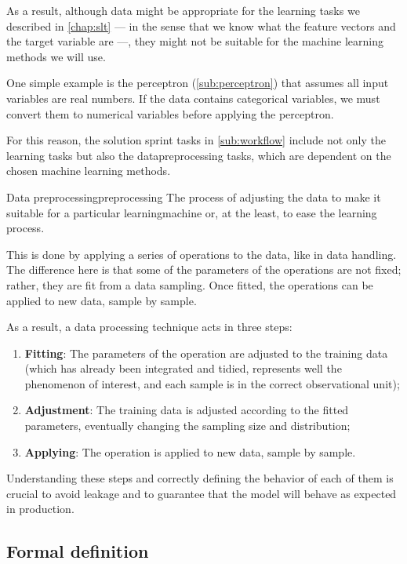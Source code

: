 As a result, although data might be appropriate for the learning tasks we described in
\cref{chap:slt} --- in the sense that we know what the feature vectors and the target
variable are ---, they might not be suitable for the machine learning methods we will use.

One simple example is the perceptron (\cref{sub:perceptron}) that assumes all
input variables are real numbers.  If the data contains categorical variables, we must
convert them to numerical variables before applying the perceptron.

For this reason, the solution sprint tasks in \cref{sub:workflow} include not only the
learning tasks but also the \gls{datapreprocessing} tasks, which are dependent on the
chosen machine learning methods.

\begin{defbox}{Data preprocessing}{preprocessing}
  The process of adjusting the data to make it suitable for a particular \gls{learningmachine}
  or, at the least, to ease the learning process.
\end{defbox}

This is done by applying a series of operations to the data, like in data handling.  The
difference here is that some of the parameters of the operations are not fixed; rather, they
are fit from a data sampling.  Once fitted, the operations can be applied to
new data, sample by sample.

As a result, a data processing technique acts in three steps:
\begin{enumerate}
  \itemsep0em
  \item \textbf{Fitting}: The parameters of the operation are adjusted to the training
    data (which has already been integrated and tidied, represents well the phenomenon of
    interest, and each sample is in the correct observational unit);
  \item \textbf{Adjustment}: The training data is adjusted according to the fitted
    parameters, eventually changing the sampling size and distribution;
  \item \textbf{Applying}: The operation is applied to new data, sample by sample.
\end{enumerate}

Understanding these steps and correctly defining the behavior of each of them is crucial
to avoid \gls{leakage} and to guarantee that the model will behave as expected in
production.

\subsection{Formal definition}
\label{sub:formal-preprocessing}

